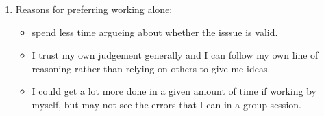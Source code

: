 \begin{enumerate}
\begin{itemize}
\end{itemize}

\item  Reasons for preferring working alone:
\begin{itemize}
\item spend less time argueing about whether the isssue is valid.
\item I trust my own judgement generally and I can follow my own line of
reasoning rather than relying on others to give me ideas.
\item I could get a lot more done in a given amount of time if working by
myself, but may not see the errors that I can in a group session.

\end{itemize}

\end{enumerate}


